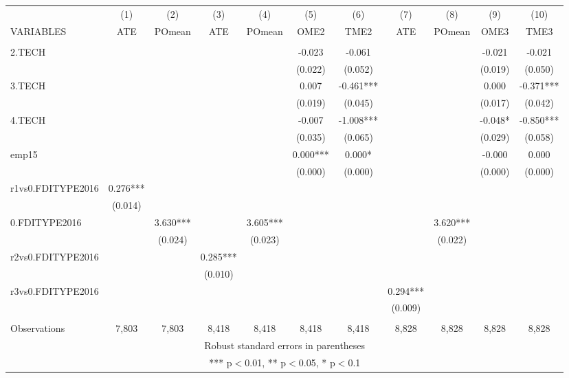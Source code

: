 \documentclass[]{article}
\begin{document}
\begin{tabular}{lcccccccccc} \hline
 & (1) & (2) & (3) & (4) & (5) & (6) & (7) & (8) & (9) & (10) \\
VARIABLES & ATE & POmean & ATE & POmean & OME2 & TME2 & ATE & POmean & OME3 & TME3 \\ \hline
 &  &  &  &  &  &  &  &  &  &  \\
2.TECH &  &  &  &  & -0.023 & -0.061 &  &  & -0.021 & -0.021 \\
 &  &  &  &  & (0.022) & (0.052) &  &  & (0.019) & (0.050) \\
3.TECH &  &  &  &  & 0.007 & -0.461*** &  &  & 0.000 & -0.371*** \\
 &  &  &  &  & (0.019) & (0.045) &  &  & (0.017) & (0.042) \\
4.TECH &  &  &  &  & -0.007 & -1.008*** &  &  & -0.048* & -0.850*** \\
 &  &  &  &  & (0.035) & (0.065) &  &  & (0.029) & (0.058) \\
emp15 &  &  &  &  & 0.000*** & 0.000* &  &  & -0.000 & 0.000 \\
 &  &  &  &  & (0.000) & (0.000) &  &  & (0.000) & (0.000) \\
r1vs0.FDITYPE2016 & 0.276*** &  &  &  &  &  &  &  &  &  \\
 & (0.014) &  &  &  &  &  &  &  &  &  \\
0.FDITYPE2016 &  & 3.630*** &  & 3.605*** &  &  &  & 3.620*** &  &  \\
 &  & (0.024) &  & (0.023) &  &  &  & (0.022) &  &  \\
r2vs0.FDITYPE2016 &  &  & 0.285*** &  &  &  &  &  &  &  \\
 &  &  & (0.010) &  &  &  &  &  &  &  \\
r3vs0.FDITYPE2016 &  &  &  &  &  &  & 0.294*** &  &  &  \\
 &  &  &  &  &  &  & (0.009) &  &  &  \\
 &  &  &  &  &  &  &  &  &  &  \\
 Observations & 7,803 & 7,803 & 8,418 & 8,418 & 8,418 & 8,418 & 8,828 & 8,828 & 8,828 & 8,828 \\ \hline
\multicolumn{11}{c}{ Robust standard errors in parentheses} \\
\multicolumn{11}{c}{ *** p$<$0.01, ** p$<$0.05, * p$<$0.1} \\
\end{tabular}
\end{document}
